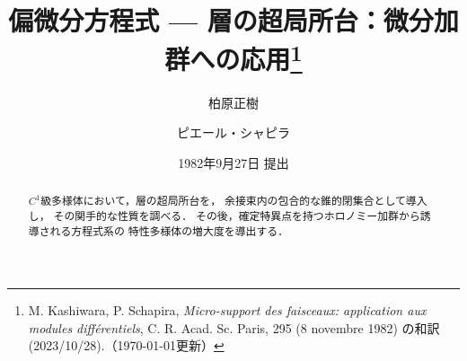 

\def\inner<#1>{\langle #1 \rangle}








\title{偏微分方程式 --- 層の超局所台：微分加群への応用\footnote{
    M. Kashiwara, P. Schapira, 
    \emph{Micro-support des faisceaux: 
    application aux modules diff\'erentiels}, 
    C. R. Acad. Sc. Paris, 295 (8 novembre 1982) 
    の和訳 (2023/10/28).（\today 更新）
}}
\author{柏原正樹\and ピエール・シャピラ}
\date{1982年9月27日 提出}

\maketitle
\begin{abstract}
    \(C^1\)級多様体において，層の超局所台を，
    余接束内の包合的な錐的閉集合として導入し，
    その関手的な性質を調べる．
    その後，確定特異点を持つホロノミー加群から誘導される方程式系の
    特性多様体の増大度を導出する．
\end{abstract}
